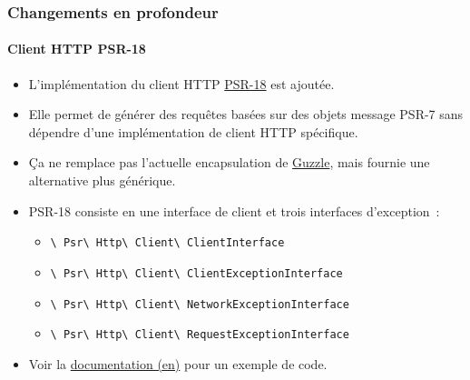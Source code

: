 
\begin{frame}[fragile]
	\frametitle{Changements en profondeur}
	\framesubtitle{Client HTTP PSR-18}

	\begin{itemize}
		\item L'implémentation du client HTTP
			\href{https://www.php-fig.org/psr/psr-18/}{PSR-18} est ajoutée.
		\item Elle permet de générer des requêtes basées sur des objets message
			PSR-7 sans dépendre d'une implémentation de client HTTP spécifique.
		\item Ça ne remplace pas l'actuelle encapsulation de \href{http://guzzlephp.org/}{Guzzle},
			mais fournie une alternative plus générique.
		\item PSR-18 consiste en une interface de client et trois interfaces d'exception~:

			\begin{itemize}\smaller
				\item \texttt{\textbackslash
					Psr\textbackslash
					Http\textbackslash
					Client\textbackslash
					ClientInterface}
				\item \texttt{\textbackslash
					Psr\textbackslash
					Http\textbackslash
					Client\textbackslash
					ClientExceptionInterface}
				\item \texttt{\textbackslash
					Psr\textbackslash
					Http\textbackslash
					Client\textbackslash
					NetworkExceptionInterface}
				\item \texttt{\textbackslash
					Psr\textbackslash
					Http\textbackslash
					Client\textbackslash
					RequestExceptionInterface}
			\end{itemize}\normalsize

		\item Voir la
			\href{https://docs.typo3.org/c/typo3/cms-core/master/en-us/Changelog/10.1/Feature-89216-PSR-18HTTPClientImplementation.html}{documentation (en)}
			pour un exemple de code.

	\end{itemize}

\end{frame}


